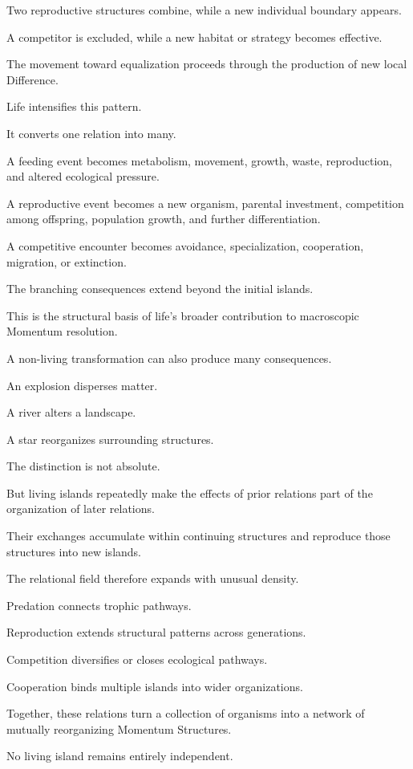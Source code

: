 Two reproductive structures combine, while a new individual boundary appears.

A competitor is excluded, while a new habitat or strategy becomes effective.

The movement toward equalization proceeds through the production of new local Difference.

Life intensifies this pattern.

It converts one relation into many.

A feeding event becomes metabolism, movement, growth, waste, reproduction, and altered ecological pressure.

A reproductive event becomes a new organism, parental investment, competition among offspring, population growth, and further differentiation.

A competitive encounter becomes avoidance, specialization, cooperation, migration, or extinction.

The branching consequences extend beyond the initial islands.

This is the structural basis of life’s broader contribution to macroscopic Momentum resolution.

A non-living transformation can also produce many consequences.

An explosion disperses matter.

A river alters a landscape.

A star reorganizes surrounding structures.

The distinction is not absolute.

But living islands repeatedly make the effects of prior relations part of the organization of later relations.

Their exchanges accumulate within continuing structures and reproduce those structures into new islands.

The relational field therefore expands with unusual density.

Predation connects trophic pathways.

Reproduction extends structural patterns across generations.

Competition diversifies or closes ecological pathways.

Cooperation binds multiple islands into wider organizations.

Together, these relations turn a collection of organisms into a network of mutually reorganizing Momentum Structures.

No living island remains entirely independent.

